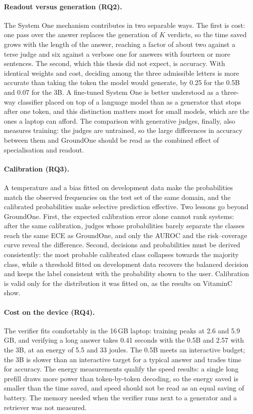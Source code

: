 \paragraph{Readout versus generation (RQ2).} The System One mechanism contributes in two separable ways. The first is
cost: one pass over the answer replaces the generation of $K$ verdicts, so the time saved grows with the length of the
answer, reaching a factor of about two against a terse judge and six against a verbose one for answers with fourteen or
more sentences. The second, which this thesis did not expect, is accuracy. With identical weights and cost, deciding
among the three admissible letters is more accurate than taking the token the model would generate, by 0.25 for the
0.5B and 0.07 for the 3B. A fine-tuned System One is better understood as a three-way classifier placed on top of a
language model than as a generator that stops after one token, and this distinction matters most for small models,
which are the ones a laptop can afford. The comparison with generative judges, finally, also measures training: the
judges are untrained, so the large differences in accuracy between them and GroundOne should be read as the combined
effect of specialisation and readout.

\paragraph{Calibration (RQ3).} A temperature and a bias fitted on development data make the probabilities match the
observed frequencies on the test set of the same domain, and the calibrated probabilities make selective prediction
effective. Two lessons go beyond GroundOne. First, the expected calibration error alone cannot rank systems: after the
same calibration, judges whose probabilities barely separate the classes reach the same ECE as GroundOne, and only the
AUROC and the risk--coverage curve reveal the difference. Second, decisions and probabilities must be derived
consistently: the most probable calibrated class collapses towards the majority class, while a threshold fitted on
development data recovers the balanced decision and keeps the label consistent with the probability shown to the user.
Calibration is valid only for the distribution it was fitted on, as the results on VitaminC show.

\paragraph{Cost on the device (RQ4).} The verifier fits comfortably in the 16\,GB laptop: training peaks at 2.6 and
5.9\,GB, and verifying a long answer takes 0.41 seconds with the 0.5B and 2.57 with the 3B, at an energy of 5.5 and 33
joules. The 0.5B meets an interactive budget; the 3B is slower than an interactive target for a typical answer and
trades time for accuracy. The energy measurements qualify the speed results: a single long prefill draws more power than
token-by-token decoding, so the energy saved is smaller than the time saved, and speed should not be read as an equal
saving of battery. The memory needed when the verifier runs next to a generator and a retriever was not measured.

